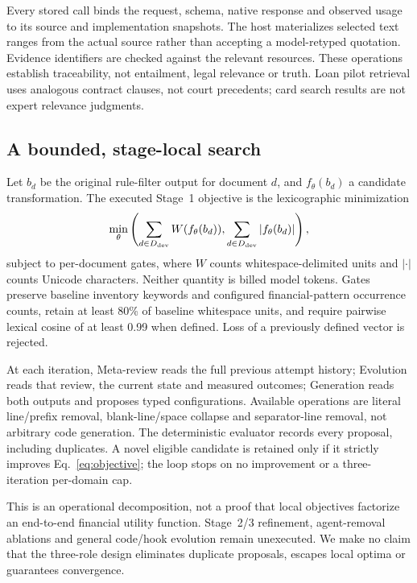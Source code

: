 \documentclass[11pt]{article}
\begin{document}
Every stored call binds the request, schema, native response and observed
usage to its source and implementation snapshots. The host materializes
selected text ranges from the actual source rather than accepting a
model-retyped quotation. Evidence identifiers are checked against the
relevant resources. These operations establish traceability, not entailment,
legal relevance or truth. Loan pilot retrieval uses analogous contract
clauses, not court precedents; card search results are not expert relevance
judgments.

\subsection{A bounded, stage-local search}
Let $b_d$ be the original rule-filter output for document $d$, and
$f_\theta(b_d)$ a candidate transformation. The executed Stage~1 objective is
the lexicographic minimization
\begin{equation}
 \min_\theta \left(
 \sum_{d\in D_{\rm dev}} W(f_\theta(b_d)),
 \sum_{d\in D_{\rm dev}} |f_\theta(b_d)|
 \right),
 \label{eq:objective}
\end{equation}
subject to per-document gates, where $W$ counts whitespace-delimited units
and $|\cdot|$ counts Unicode characters. Neither quantity is billed model
tokens. Gates preserve baseline inventory keywords and configured
financial-pattern occurrence counts, retain at least 80\% of baseline
whitespace units, and require pairwise lexical cosine of at least 0.99
when defined. Loss of a previously defined vector is rejected.

At each iteration, Meta-review reads the full previous attempt history;
Evolution reads that review, the current state and measured outcomes;
Generation reads both outputs and proposes typed configurations.
Available operations are literal line/prefix removal, blank-line/space
collapse and separator-line removal, not arbitrary code generation.
The deterministic evaluator records every proposal, including duplicates.
A novel eligible candidate is retained only if it strictly improves
Eq.~\ref{eq:objective}; the loop stops on no improvement or a
three-iteration per-domain cap.

This is an operational decomposition, not a proof that local objectives
factorize an end-to-end financial utility function. Stage~2/3 refinement,
agent-removal ablations and general code/hook evolution remain unexecuted.
We make no claim that the three-role design eliminates duplicate proposals,
escapes local optima or guarantees convergence.
\end{document}
